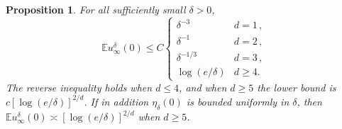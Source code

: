 \documentclass[11pt]{amsart}
\theoremstyle{plain}
\newtheorem{proposition}[theorem]{Proposition}
\theoremstyle{definition}
\newcommand{\E}{\mathbb{E}}
\begin{document}
\begin{proposition}\label{prop:near-divisible}
	  For all
	sufficiently small $\delta>0$,
	\begin{equation}\label{eq:near-divisible-upper}
		\E u_\infty^\delta(0)\leq C
		\begin{cases}
			\delta^{-3}&d=1\,,\\
			\delta^{-1}&d=2\,,\\
			\delta^{-1/3}&d=3\,,\\
			\log(e/\delta)&d\geq4.
		\end{cases}
	\end{equation}
	The reverse inequality holds when $d\leq4$, and when $d\geq5$ the lower bound
	is $c[\log(e/\delta)]^{2/d}$. If in addition $\eta_\delta(0)$ is bounded
	uniformly in $\delta$, then $\E u_\infty^\delta(0)\asymp[\log(e/\delta)]^{2/d}$
	when $d\geq5$.
\end{proposition}
\end{document}

